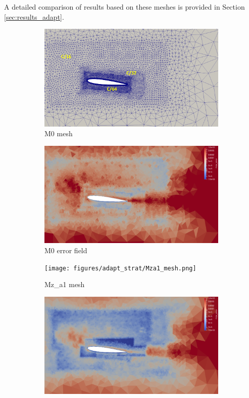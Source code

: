 A detailed comparison of results based on these meshes is provided in Section \ref{sec:results_adapt}.

\begin{figure}[H]
\centering
\begin{subfigure}[b]{0.475\textwidth}
\centering
\includegraphics[width=1\textwidth]{figures/adapt_strat/M0_mesh.png}
\caption{M0 mesh}
\label{fig:M0_mesh}
\end{subfigure}
\begin{subfigure}[b]{0.475\textwidth}
\centering
\includegraphics[width=1\textwidth]{figures/adapt_strat/M0_error_plot.png}
\caption{M0 error field}
\label{fig:M0_err_plot}
\end{subfigure}
\begin{subfigure}[b]{0.475\textwidth}
\centering
\texttt{[image: figures/adapt\_strat/Mza1\_mesh.png]}
\caption{Mz\_a1 mesh}
\label{fig:Mza1_mesh}
\end{subfigure}
\begin{subfigure}[b]{0.475\textwidth}
\centering
\includegraphics[width=1\textwidth]{figures/adapt_strat/Mza1_error_plot.png}

\end{subfigure}
\end{figure}
